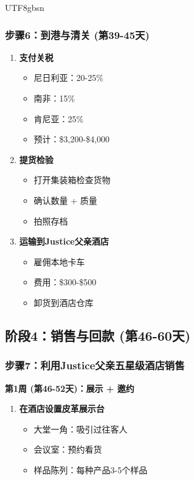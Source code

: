\documentclass[12pt,a4paper]{article}
\begin{document}
\begin{CJK}{UTF8}{gbsn}
\subsubsection{步骤6：到港与清关 (第39-45天)}

\begin{enumerate}
    \item \textbf{支付关税}
    \begin{itemize}
        \item 尼日利亚：20-25\%
        \item 南非：15\%
        \item 肯尼亚：25\%
        \item 预计：\$3,200-\$4,000
    \end{itemize}
    
    \item \textbf{提货检验}
    \begin{itemize}
        \item 打开集装箱检查货物
        \item 确认数量 + 质量
        \item 拍照存档
    \end{itemize}
    
    \item \textbf{运输到Justice父亲酒店}
    \begin{itemize}
        \item 雇佣本地卡车
        \item 费用：\$300-\$500
        \item 卸货到酒店仓库
    \end{itemize}
\end{enumerate}

\newpage

\subsection{阶段4：销售与回款 (第46-60天)}

\subsubsection{步骤7：利用Justice父亲五星级酒店销售}

\textbf{第1周 (第46-52天)：展示 + 邀约}

\begin{enumerate}
    \item \textbf{在酒店设置皮革展示台}
    \begin{itemize}
        \item 大堂一角：吸引过往客人
        \item 会议室：预约看货
        \item 样品陈列：每种产品3-5个样品
    \end{itemize}
    

\end{enumerate}
\end{CJK}
\end{document}
